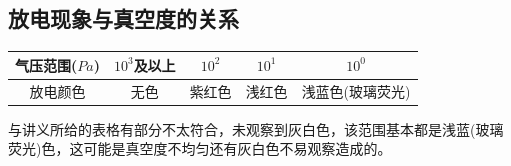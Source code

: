 \documentclass[UTF8]{ctexart}
\begin{document}
\subsection{放电现象与真空度的关系}
\begin{table}[!htbp]
	\centering
	\begin{tabular}{|c|c|c|c|c|}
		\hline
		气压范围($Pa$) & $10^3$及以上 & $10^2$ & $10^1 $ & $10^0$ \\
		\hline
		放电颜色 & 无色 & 紫红色 & 浅红色 & 浅蓝色(玻璃荧光) \\
		\hline
	\end{tabular}
\end{table}
\par
与讲义所给的表格有部分不太符合，未观察到灰白色，该范围基本都是浅蓝(玻璃荧光)色，这可能是真空度不均匀还有灰白色不易观察造成的。
\end{document}
